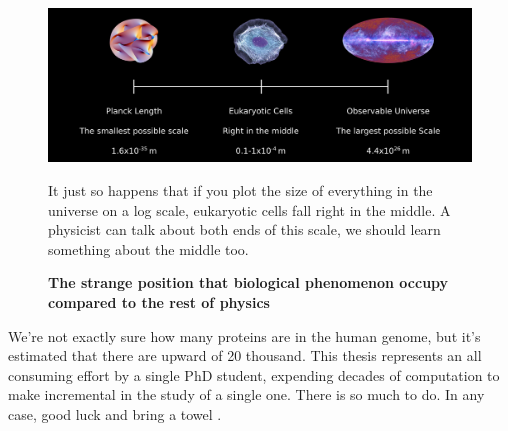 \begin{figure}
	\begin{center}
		\includegraphics[width=1.0\textwidth]{figures/scales.png}
	\end{center}
	\captionsetup{singlelinecheck = false, justification=raggedright}
	\caption[The strange position that biological phenomenon occupy compared to the rest of physics] {\textbf{The strange position that biological phenomenon occupy compared to the rest of physics}}{It just so happens that if you plot the size of everything  in the universe on a log scale, eukaryotic cells fall right in the middle. A physicist can talk about both ends of this scale, we should learn something about the middle too.}
	\label{biology_scales}
\end{figure}

We're not exactly sure how many proteins are in the human genome, but it's estimated that there are upward of 20 thousand. This thesis represents an all consuming effort by a single PhD student, expending decades of computation to make incremental in the study of a single one. There is so much to do. In any case, good luck and bring a towel \cite{adams1979}. 
